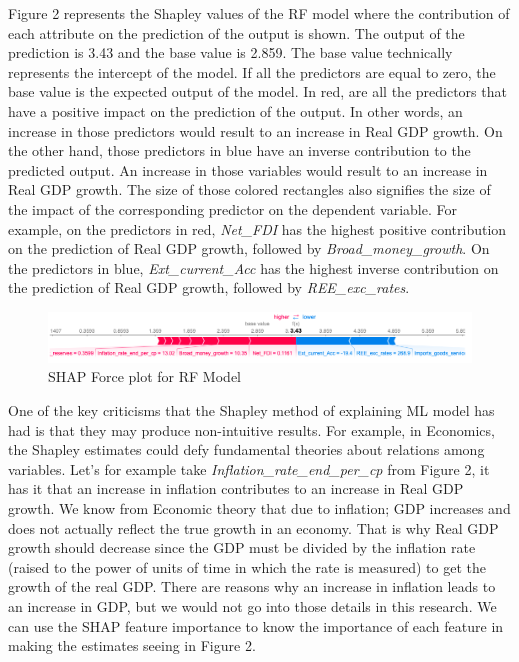 \documentclass[12pt,italian, twoside]{report}
\begin{document}
\begin{enumerate}
		Figure 2 represents the Shapley values of the RF model where the contribution of each attribute on the prediction of the output is shown. The output of the prediction is 3.43 and the base value is 2.859. The base value technically represents the intercept of the model. If all the predictors are equal to zero, the base value is the expected output of the model. In red, are all the predictors that have a positive impact on the prediction of the output. In other words, an increase in those predictors would result to an increase in Real GDP growth. On the other hand, those predictors in blue have an inverse contribution to the predicted output. An increase in those variables would result to an increase in Real GDP growth. The size of those colored rectangles also signifies the size of the impact of the corresponding predictor on the dependent variable. For example, on the predictors in red, \textit{Net\_FDI} has the highest positive contribution on the prediction of Real GDP growth, followed by \textit{Broad\_money\_growth}. On the predictors in blue, \textit{Ext\_current\_Acc} has the highest inverse contribution on the prediction of Real GDP growth, followed by \textit{REE\_exc\_rates}.
		\begin{figure}[t]
			\centering
			\includegraphics[width = 150mm]{immagini/Shap.png}
			\caption{SHAP Force plot for RF Model}
			\label{fig:SHAP}
		\end{figure}
	One of the key criticisms that the Shapley method of explaining ML model has had is that they may produce non-intuitive results. For example, in Economics, the Shapley estimates could defy fundamental theories about relations among variables. Let’s for example take \textit{Inflation\_rate\_end\_per\_cp} from Figure 2, it has it that an increase in inflation contributes to an increase in Real GDP growth. We know from Economic theory that due to inflation; GDP increases and does not actually reflect the true growth in an economy. That is why Real GDP growth should decrease since the GDP must be divided by the inflation rate (raised to the power of units of time in which the rate is measured) to get the growth of the real GDP. There are reasons why an increase in inflation leads to an increase in GDP, but we would not go into those details in this research. We can use the SHAP feature importance to know the importance of each feature in making the estimates seeing in Figure 2.\\

\end{enumerate}
\end{document}
